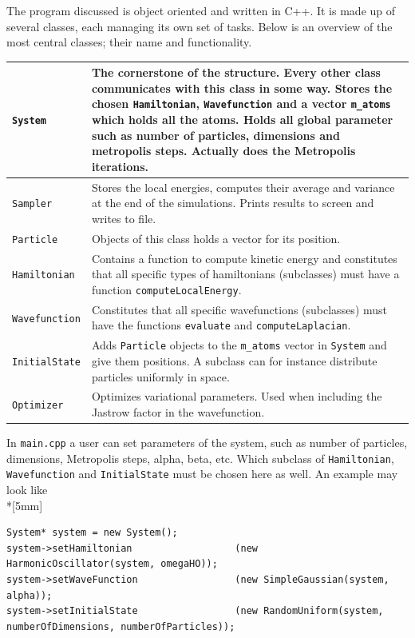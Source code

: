 \documentclass[english, a4paper]{article}
\begin{document}
The program discussed is object oriented and written in C++. It is made up of several classes, each managing its own set of tasks. 
Below is an overview of the most central classes; their name and functionality.
\renewcommand{\arraystretch}{1.8}
\begin{table}[H]
	\centering
	\begin{tabularx}{\textwidth}{ p{2.5cm}  p{14.5cm} }
		\hline
		\texttt{System}& The cornerstone of the structure. Every other class communicates with this class in some way. \newline
		Stores the chosen \texttt{Hamiltonian}, \texttt{Wavefunction} and  a vector \texttt{m\_atoms} which holds all the atoms. 
		Holds all global parameter such as number of particles, dimensions and metropolis steps. \newline
		Actually does the Metropolis iterations.\\*
		\hline
		\texttt{Sampler}& Stores the local energies, computes their average and variance at the end of the simulations.
		Prints results to screen and writes to file.\\*		
		\hline
		\texttt{Particle}& Objects of this class holds a vector for its position.\\*
		\hline
		\texttt{Hamiltonian}& Contains a function to compute kinetic energy and constitutes that all specific types of
		hamiltonians (subclasses) must have a function \texttt{computeLocalEnergy}.\\*  
		\hline
		\texttt{Wavefunction}& Constitutes that all specific wavefunctions (subclasses) must have the functions \texttt{evaluate} and
		\texttt{computeLaplacian}.\\*
		\hline
		\texttt{InitialState}& Adds \texttt{Particle} objects to the \texttt{m\_atoms} vector in \texttt{System} and give them positions.
		A subclass can for instance distribute particles uniformly in space.\\*
		\hline
		\texttt{Optimizer}& Optimizes variational parameters. Used when including the Jastrow factor in the wavefunction.\\*
		\hline
	\end{tabularx}
\end{table}
In \texttt{main.cpp} a user can set parameters of the system, such as number of particles, dimensions, Metropolis steps, alpha, beta, etc.
Which subclass of \texttt{Hamiltonian}, \texttt{Wavefunction} and \texttt{InitialState} must be chosen here as well. An example may look like \\*[5mm]
\begin{verbatim}
System* system = new System();
system->setHamiltonian                  (new HarmonicOscillator(system, omegaHO));
system->setWaveFunction                 (new SimpleGaussian(system, alpha));
system->setInitialState                 (new RandomUniform(system, numberOfDimensions, numberOfParticles));
\end{verbatim}
\end{document}
